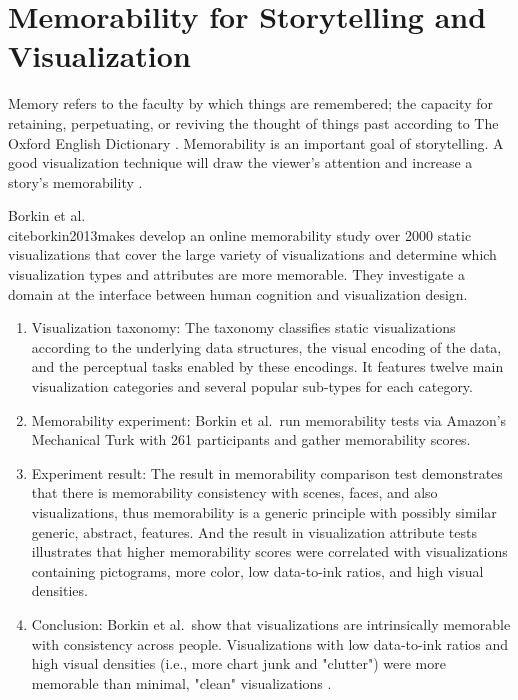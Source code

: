 \documentclass{egpubl}
\begin{document}
\section{Memorability for Storytelling and Visualization}
Memory refers to the faculty by which things are remembered; the capacity for retaining, perpetuating, or reviving the thought of things past according to The Oxford English Dictionary \cite{memory}. Memorability is an important goal of storytelling. A good visualization technique will draw the viewer's attention and increase a story's memorability \cite{bateman}.

 Borkin et al.\\cite{borkin2013makes} develop an online memorability study over 2000 static visualizations that cover the large variety of visualizations and determine which visualization types and attributes are more memorable. They investigate a domain at the interface between human cognition and visualization design.
\begin{enumerate}
\item Visualization taxonomy: The taxonomy classifies static visualizations according to the underlying data structures, the visual encoding of the data, and the perceptual tasks enabled by these encodings. It features twelve main visualization categories and several popular sub-types for each category.
\item Memorability experiment: Borkin et al.\ run memorability tests via Amazon's Mechanical Turk with 261 participants and gather memorability scores.
\item Experiment result: The result in memorability comparison test demonstrates that there is memorability consistency with scenes, faces, and also visualizations, thus memorability is a generic principle with possibly similar generic, abstract, features. And the result in visualization attribute tests illustrates that higher memorability scores were correlated with visualizations containing pictograms, more color, low data-to-ink ratios, and high visual densities.
\item Conclusion: Borkin et al.\ show that visualizations are intrinsically memorable with consistency across people. Visualizations with low data-to-ink ratios and high visual densities (i.e., more chart junk and "clutter") were more memorable than minimal, "clean" visualizations \cite{borkin2013makes}. 

\end{enumerate}
\end{document}
